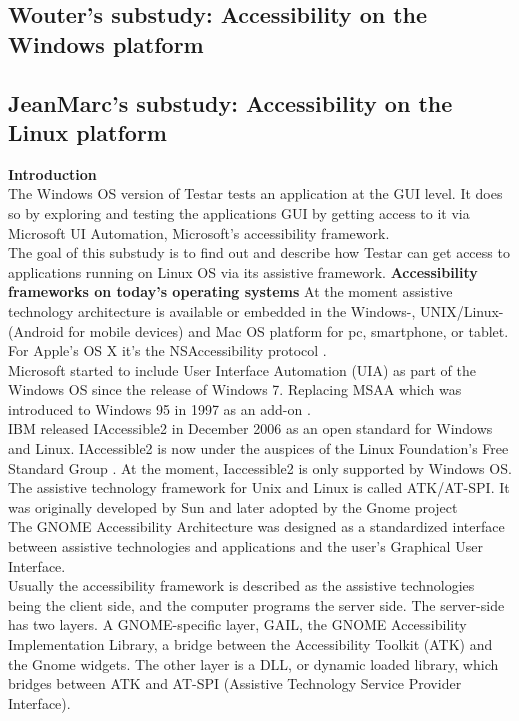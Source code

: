 \documentclass[11pt,twocolumn]{article}
\begin{document}
\subsection{Wouter's substudy: Accessibility on the Windows platform}


\subsection{Jean\-Marc's substudy: Accessibility on the Linux platform}
\textbf{Introduction}
\\The Windows OS version of Testar tests an application at the GUI level.
It does so by exploring and testing the applications GUI by getting
access to it via Microsoft UI Automation, Microsoft's accessibility
framework\cite{RN7}. 
\\The goal of this substudy is to find out and describe how Testar can get
access to applications running on Linux OS via its assistive framework.
\textbf{Accessibility frameworks on today’s operating systems}
At the moment assistive technology architecture is available or embedded in the Windows-, UNIX/Linux- (Android for mobile devices) and Mac OS platform for pc, smartphone, or tablet.
\\For Apple’s OS X it’s the NSAccessibility protocol \cite{RN8}.
\\Microsoft started to include User Interface Automation (UIA) as part of the Windows OS since the release of Windows 7. Replacing MSAA which was introduced to Windows 95 in 1997 as an add-on \cite{RN9}.
\\IBM released IAccessible2 in December 2006 as an open standard for Windows and Linux. IAccessible2 is now under the auspices of the Linux Foundation's Free Standard Group \cite{RN10}.
At the moment, Iaccessible2 is only supported by Windows OS. 
\\The assistive technology framework for Unix and Linux is called ATK/AT-SPI. It was originally developed by Sun and later adopted by the Gnome project\cite{RN24}
\\The GNOME Accessibility Architecture was designed as a standardized interface between assistive technologies and applications and the user's Graphical User Interface. 
\\Usually the accessibility framework is described as the assistive technologies being the client side, and the computer programs the server side. \cite{RN12}
The server-side has two layers. A GNOME-specific layer, GAIL, the GNOME Accessibility Implementation Library, a bridge between the Accessibility Toolkit (ATK) and the Gnome widgets. The other layer is a DLL, or dynamic loaded library,  which bridges between ATK and AT-SPI (Assistive Technology Service Provider Interface).
\end{document}

